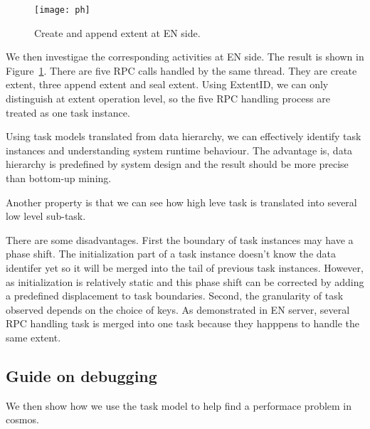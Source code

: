 \begin{figure}
\centering
\texttt{[image: ph]}
\caption{Create and append extent at EN side.}
\label{fig:createextent}
\end{figure}

We then investigae the corresponding activities at EN side.
The result is shown in Figure~\ref{fig:createextent}. There
are five RPC calls handled by the same thread. They are
create extent, three append extent and seal extent. Using
ExtentID, we can only distinguish at extent operation level,
so the five RPC handling process are treated as one task
instance.

\lesson Using task models translated from data hierarchy, we
can effectively identify task instances and understanding
system runtime behaviour. The advantage is, data
hierarchy is predefined by system design and the result
should be more precise than bottom-up mining.

Another property is that we can see how high leve task is
translated into several low level sub-task.


There are some disadvantages. First the boundary of task
instances may have a phase shift. The initialization part of
a task instance doesn't know the data identifer yet so it
will be merged into the tail of previous task instances.
However, as initialization is relatively static and this
phase shift can be corrected by adding a predefined
displacement to task boundaries. Second, the granularity of
task observed depends on the choice of keys. As demonstrated
in EN server, several RPC handling task is merged into one
task because they happpens to handle the same extent.

\subsection{Guide on debugging}

We then show how we use the task model to help find a
performace problem in cosmos.

